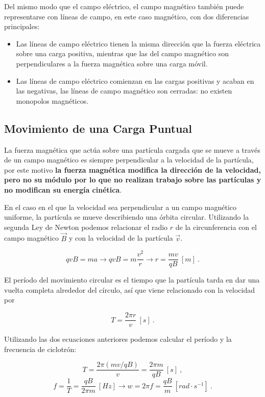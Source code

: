 \documentclass{tufte-handout}
\begin{document}
Del mismo modo que el campo eléctrico, el campo magnético también puede representarse con líneas de campo, en este caso magnético, con dos diferencias principales:

\begin{itemize}
    \item Las líneas de campo eléctrico tienen la misma dirección que la fuerza eléctrica sobre una carga positiva, mientras que las del campo magnético son perpendiculares a la fuerza magnética sobre una carga móvil.
    \item Las líneas de campo eléctrico comienzan en las cargas positivas y acaban en las negativas, las líneas de campo magnético son cerradas: no existen monopolos magnéticos.
\end{itemize}

\subsection{Movimiento de una Carga Puntual}

La fuerza magnética que actúa sobre una partícula cargada que se mueve a través de un campo magnético es siempre perpendicular a la velocidad de la partícula, por este motivo \textbf{la fuerza magnética modifica la dirección de la velocidad, pero no su módulo por lo que no realizan trabajo sobre las partículas y no modifican su energía cinética}.

En el caso en el que la velocidad sea perpendicular a un campo magnético uniforme, la partícula se mueve describiendo una órbita circular. Utilizando la segunda Ley de Newton podemos relacionar el radio $r$ de la circunferencia con el campo magnético $\vec{B}$ y con la velocidad de la partícula $\vec{v}$.

\begin{equation}
qvB = ma \rightarrow qvB = m\frac{v^2}{r} \rightarrow r = \frac{mv}{qB}~[m]~.
\end{equation}

El período del movimiento circular es el tiempo que la partícula tarda en dar una vuelta completa alrededor del círculo, así que viene relacionado con la velocidad por

\begin{equation}
T = \frac{2\pi r}{v}~[s]~.
\end{equation}

Utilizando las dos ecuaciones anteriores podemos calcular el período y la frecuencia de ciclotrón:

\begin{equation}
T = \frac{2\pi(mv/qB)}{v} = \frac{2\pi m}{qB}~[s]~,
\end{equation}
\begin{equation}
f = \frac{1}{T} = \frac{qB}{2\pi m}~[Hz] \rightarrow w = 2\pi f = \frac{qB}{m}~[rad\cdot s^{-1}]~.
\end{equation}
\end{document}
